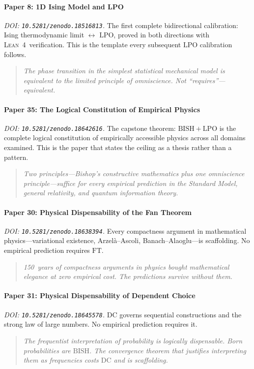 \documentclass[11pt,a4paper]{report}
\theoremstyle{plain}
\theoremstyle{definition}
\theoremstyle{remark}
\newcommand{\BISH}{\mathrm{BISH}}
\newcommand{\LPO}{\mathrm{LPO}}
\newcommand{\FT}{\mathrm{FT}}
\newcommand{\DC}{\mathrm{DC}}
\newcommand{\Lean}{\textsc{Lean~4}}
\begin{document}
\paragraph{Paper 8: 1D Ising Model and LPO}
\emph{DOI: \texttt{10.5281/zenodo.18516813}.}\quad
The first complete bidirectional calibration: Ising thermodynamic limit $\leftrightarrow$ $\LPO$, proved in both directions with \Lean\ verification.  This is the template every subsequent $\LPO$ calibration follows.
\begin{quote}\itshape
The phase transition in the simplest statistical mechanical model is equivalent to the limited principle of omniscience.  Not ``requires''---equivalent.
\end{quote}

\paragraph{Paper 35: The Logical Constitution of Empirical Physics}
\emph{DOI: \texttt{10.5281/zenodo.18642616}.}\quad
The capstone theorem: $\BISH+\LPO$ is the complete logical constitution of empirically accessible physics across all domains examined.  This is the paper that states the ceiling as a thesis rather than a pattern.
\begin{quote}\itshape
Two principles---Bishop's constructive mathematics plus one omniscience principle---suffice for every empirical prediction in the Standard Model, general relativity, and quantum information theory.
\end{quote}

\paragraph{Paper 30: Physical Dispensability of the Fan Theorem}
\emph{DOI: \texttt{10.5281/zenodo.18638394}.}\quad
Every compactness argument in mathematical physics---variational existence, Arzel\`a--Ascoli, Banach--Alaoglu---is scaffolding.  No empirical prediction requires $\FT$.
\begin{quote}\itshape
150~years of compactness arguments in physics bought mathematical elegance at zero empirical cost.  The predictions survive without them.
\end{quote}

\paragraph{Paper 31: Physical Dispensability of Dependent Choice}
\emph{DOI: \texttt{10.5281/zenodo.18645578}.}\quad
$\DC$ governs sequential constructions and the strong law of large numbers.  No empirical prediction requires it.
\begin{quote}\itshape
The frequentist interpretation of probability is logically dispensable.  Born probabilities are $\BISH$.  The convergence theorem that justifies interpreting them as frequencies costs $\DC$ and is scaffolding.
\end{quote}
\end{document}
